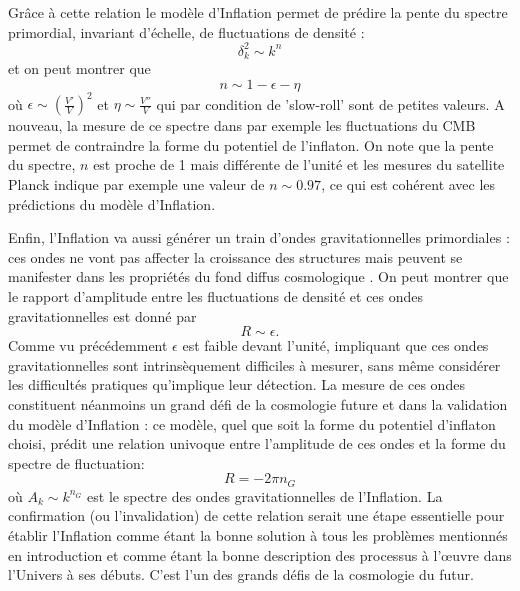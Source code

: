 Grâce à cette relation le modèle d'Inflation permet de prédire la pente du spectre primordial, invariant d'échelle, de fluctuations de densité :
\begin{equation}
\delta^2_k\sim k^n
\end{equation}
et on peut montrer que 
\begin{equation}
n\sim 1-\epsilon -\eta
\end{equation}
où $\epsilon\sim (\frac{V'}{V})^2$ et $\eta \sim \frac{V''}{V}$ qui par condition de 'slow-roll' sont de petites valeurs. A nouveau, la mesure de ce spectre dans par exemple les fluctuations du CMB permet de contraindre la forme du potentiel de l'inflaton. On note que la pente du spectre, $n$ est proche de 1 mais différente de l'unité et les mesures du satellite Planck indique par exemple une valeur de $n\sim 0.97$, ce qui est cohérent avec les prédictions du modèle d'Inflation.

Enfin, l'Inflation va aussi générer un train d'ondes gravitationnelles primordiales : ces ondes ne vont pas affecter la croissance des structures mais peuvent se manifester dans les propriétés du fond diffus cosmologique .
On peut montrer que le rapport d'amplitude entre les fluctuations de densité et ces ondes gravitationnelles est donné par
\begin{equation}
R\sim \epsilon.
\end{equation}
Comme vu précédemment $\epsilon$ est faible devant l'unité, impliquant que ces ondes gravitationnelles sont intrinsèquement difficiles à mesurer, sans même considérer les difficultés pratiques qu'implique leur détection. La mesure de ces ondes constituent néanmoins un grand défi de la cosmologie future et dans la validation du modèle d'Inflation : ce modèle, quel que soit la forme du potentiel d'inflaton choisi, prédit une relation univoque entre l'amplitude de ces ondes et la forme du spectre de fluctuation:
\begin{equation}
R=-2\pi n_G
\end{equation}
où $A_k\sim k^{n_G}$ est le spectre des ondes gravitationnelles de l'Inflation. La confirmation (ou l'invalidation) de cette relation serait une étape essentielle pour établir l'Inflation comme étant la bonne solution à tous les problèmes mentionnés en introduction et comme étant la bonne description des processus à l'œuvre dans l'Univers à ses débuts. C'est l'un des grands défis de la cosmologie du futur.